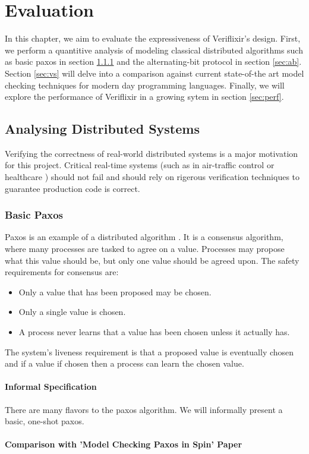 \chapter{Evaluation}
In this chapter, we aim to evaluate the expressiveness of Veriflixir's design. First, we perform a quantitive analysis of modeling classical distributed algorithms such as basic paxos in section \ref{sec:paxos} and the alternating-bit protocol in section \ref{sec:ab}. Section \ref{sec:vs} will delve into a comparison against current state-of-the art model checking techniques for modern day programming languages. Finally, we will explore the performance of Veriflixir in a growing sytem in section \ref{sec:perf}.
\section{Analysing Distributed Systems}
Verifying the correctness of real-world distributed systems is a major motivation for this project. Critical real-time systems (such as in air-traffic control or healthcare  \cite{airlines,healthcare}) should not fail and should rely on rigerous verification techniques to guarantee production code is correct.  
\subsection{Basic Paxos} \label{sec:paxos}
Paxos is an example of a distributed algorithm \cite{paxos_simple}. It is a consensus algorithm, where many processes are tasked to agree on a value. Processes may propose what this value should be, but only one value should be agreed upon. The safety requirements for consensus are:
\begin{itemize}
    \item Only a value that has been proposed may be chosen.
    \item Only a single value is chosen.
    \item A process never learns that a value has been chosen unless it actually has.
\end{itemize}
The system's liveness requirement is that a proposed value is eventually chosen and if a value if chosen then a process can learn the chosen value.
\subsubsection{Informal Specification}
There are many flavors to the paxos algorithm. We will informally present a basic, one-shot paxos. 
\subsubsection{Comparison with 'Model Checking Paxos in Spin' Paper}
